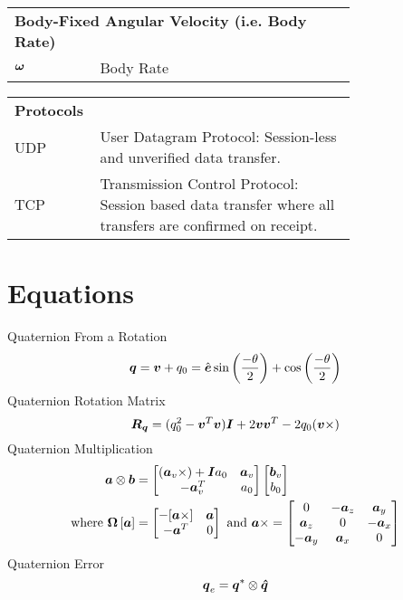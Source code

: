 \begin{nomenclature}
\begin{tabular}{lp{0.75\linewidth}}
  \multicolumn{2}{l}{\textbf{Body-Fixed Angular Velocity (i.e. Body Rate)}} \\
  $\boldsymbol{\omega}$ & Body Rate \\
\end{tabular}

\begin{tabular}{lp{0.75\linewidth}}
  \multicolumn{2}{l}{\textbf{Protocols}} \\
  UDP & User Datagram Protocol: Session-less and unverified data transfer. \\
  TCP & Transmission Control Protocol: Session based data transfer where all transfers are confirmed on receipt. \\
\end{tabular}

\section{Equations}
Quaternion From a Rotation
\begin{equation} \boldsymbol{q} = \boldsymbol{v} + q_0 = \hat{\boldsymbol{e}} \sin \left( \frac{-\theta}{2} \right) + \cos \left( \frac{-\theta}{2} \right) \end{equation}
Quaternion Rotation Matrix
\begin{equation}
  \boldsymbol{R_q} = (q_0^2 - \boldsymbol{v}^T \boldsymbol{v}) \boldsymbol{I} + 2 \boldsymbol{v} \boldsymbol{v}^T - 2 q_0 (\boldsymbol{v} \times)
\end{equation}
Quaternion Multiplication
\begin{equation}
  \begin{aligned}
    \boldsymbol{a} \otimes \boldsymbol{b} &=
    \begin{bmatrix}
      (\boldsymbol{a}_v \times) + \boldsymbol{I} a_0 & \boldsymbol{a}_v \\
      -\boldsymbol{a}_v^T                    & a_0 \\
    \end{bmatrix}
    \begin{bmatrix}
    \boldsymbol{b}_v \\ b_0
    \end{bmatrix} \\
    \text{where } \boldsymbol{\Omega} \left[ \boldsymbol{a} \right] &=
    \begin{bmatrix}
      - [ \boldsymbol{a} \times ] & \boldsymbol{a} \\
      - \boldsymbol{a}^T & 0
    \end{bmatrix} \text{ and }
    \boldsymbol{a} \times =
    \begin{bmatrix}
      0 & -\boldsymbol{a}_z & \boldsymbol{a}_y \\
      \boldsymbol{a}_z & 0 & -\boldsymbol{a}_x \\
      -\boldsymbol{a}_y & \boldsymbol{a}_x & 0 \\
    \end{bmatrix}
  \end{aligned}
\end{equation}
Quaternion Error
\begin{equation}
  \boldsymbol{q}_e = \boldsymbol{q}^* \otimes \boldsymbol{\hat{q}}
\end{equation}


\end{nomenclature}
